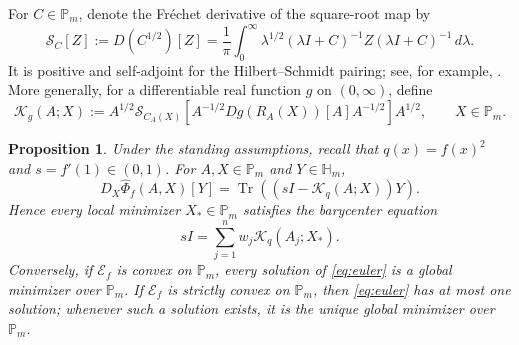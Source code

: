 \documentclass[11pt]{amsart}
\newtheorem{proposition}[theorem]{Proposition}
\theoremstyle{definition}
\theoremstyle{remark}
\newcommand{\Pm}{\mathbb P_m}
\newcommand{\Hm}{\mathbb H_m}
\newcommand{\Tr}{\operatorname{Tr}}
\newcommand{\altPhi}{\widehat{\Phi}}
\begin{document}
	For $C\in\Pm$, denote the Fr\'echet derivative of the square-root map by
	\[
	\mathcal S_C[Z]:=D(C^{1/2})[Z]
	=\frac1\pi\int_0^\infty
	\lambda^{1/2}(\lambda I+C)^{-1}
	Z(\lambda I+C)^{-1}\,d\lambda.
	\]
	It is positive and self-adjoint for the Hilbert--Schmidt pairing; see, for
	example, \cite[Chapter~6]{Higham2008}.  More generally, for a differentiable
	real function $g$ on $(0,\infty)$, define
	\begin{equation}\label{eq:Kg}
		\mathcal K_g(A;X)
		:=A^{1/2}\mathcal S_{C_A(X)}\!\left[
		A^{-1/2}Dg(R_A(X))[A]A^{-1/2}
		\right]A^{1/2},
		\qquad X\in\Pm.
	\end{equation}
	
 \begin{proposition}
		\label{prop:euler}
		Under the standing assumptions, recall that $q(x)=f(x)^2$ and
		$s=f'(1)\in(0,1)$.  For $A,X\in\Pm$ and $Y\in\Hm$,
		\begin{equation}\label{eq:first-variation}
			D_X\altPhi_f(A,X)[Y]
			=\Tr\!\left((sI-\mathcal K_q(A;X))Y\right).
		\end{equation}
		Hence every local minimizer $X_*\in\Pm$ satisfies the barycenter equation
		\begin{equation}\label{eq:euler}
			sI=\sum_{j=1}^n w_j\mathcal K_q(A_j;X_*).
		\end{equation}
		Conversely, if $\mathcal E_f$ is convex on $\Pm$, every solution of
		\eqref{eq:euler} is a global minimizer over $\Pm$.  If $\mathcal E_f$ is
		strictly convex on $\Pm$, then \eqref{eq:euler} has at most one solution;
		whenever such a solution exists, it is the unique global minimizer over
		$\Pm$.
\end{proposition}
	
\end{document}
